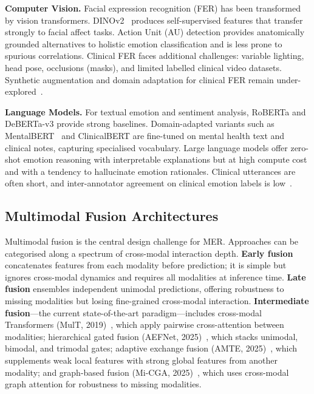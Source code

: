 \documentclass{article}
\begin{document}
\textbf{Computer Vision.} Facial expression recognition (FER) has been transformed by
vision transformers. DINOv2~\cite{oquab2023dinov2} produces self-supervised features
that transfer strongly to facial affect tasks. Action Unit (AU) detection provides
anatomically grounded alternatives to holistic emotion classification and is less prone
to spurious correlations. Clinical FER faces additional challenges: variable lighting,
head pose, occlusions (masks), and limited labelled clinical video datasets.
Synthetic augmentation and domain adaptation for clinical FER remain
under-explored~\cite{survey2025mer}.

\textbf{Language Models.} For textual emotion and sentiment analysis, RoBERTa and
DeBERTa-v3 provide strong baselines. Domain-adapted variants such as
MentalBERT~\cite{ji2022mentalbert} and ClinicalBERT are fine-tuned on mental health
text and clinical notes, capturing specialised vocabulary. Large language models offer
zero-shot emotion reasoning with interpretable explanations but at high compute cost
and with a tendency to hallucinate emotion rationales. Clinical utterances are often
short, and inter-annotator agreement on clinical emotion labels is low~\cite{survey2025mer}.

\subsection{Multimodal Fusion Architectures}

Multimodal fusion is the central design challenge for MER. Approaches can be categorised
along a spectrum of cross-modal interaction depth. \textbf{Early fusion} concatenates
features from each modality before prediction; it is simple but ignores cross-modal
dynamics and requires all modalities at inference time. \textbf{Late fusion} ensembles
independent unimodal predictions, offering robustness to missing modalities but losing
fine-grained cross-modal interaction. \textbf{Intermediate fusion}---the current
state-of-the-art paradigm---includes cross-modal Transformers (MulT, 2019)~\cite{tsai2019mult},
which apply pairwise cross-attention between modalities; hierarchical gated fusion
(AEFNet, 2025)~\cite{aefnet2025}, which stacks unimodal, bimodal, and trimodal gates;
adaptive exchange fusion (AMTE, 2025)~\cite{amte2025}, which supplements weak local
features with strong global features from another modality; and graph-based fusion
(Mi-CGA, 2025)~\cite{micga2025}, which uses cross-modal graph attention for robustness
to missing modalities.
\end{document}

